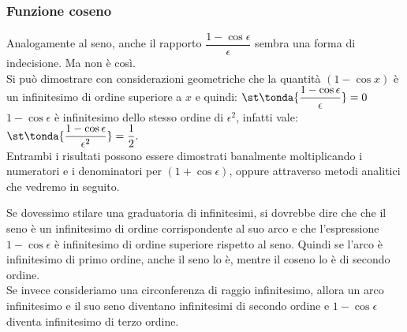 \subsubsection{Funzione coseno}
\label{subsubsec:insnum_fcoseno}
Analogamente al seno, anche il rapporto \(\dfrac{1-\cos \epsilon}{\epsilon}\)
sembra una forma di indecisione. 
Ma non è così. \\

Si può dimostrare con considerazioni geometriche che 
la quantità \((1-\cos x)\) è un infinitesimo di ordine superiore a 
\(x\) e quindi: \qquad
\(\displaystyle
 \st\tonda{\dfrac{1-\cos \epsilon}{\epsilon}}=0
\) \\

\(1-\cos \epsilon\) è infinitesimo dello stesso ordine di \(\epsilon^2\), 
infatti vale: \qquad
\(\displaystyle
 \st\tonda{\dfrac{1-\cos \epsilon}{\epsilon^2}}=\dfrac{1}{2}.
\) \\

Entrambi i risultati possono essere dimostrati banalmente moltiplicando i 
numeratori e i denominatori per \((1+\cos \epsilon)\), oppure attraverso 
metodi analitici che vedremo in seguito.

\begin{osservazione}
Se dovessimo stilare una graduatoria di infinitesimi, si dovrebbe dire che 
che il seno è un infinitesimo di ordine corrispondente al suo arco e che 
l'espressione \(1-\cos \epsilon\) è infinitesimo di ordine superiore 
rispetto al seno.
Quindi se l'arco è infinitesimo di primo ordine, anche il seno lo è, mentre
il coseno lo è di secondo ordine.\\
Se invece consideriamo una circonferenza di raggio infinitesimo, 
allora un arco infinitesimo e il suo seno diventano infinitesimi di secondo 
ordine e \(1-\cos \epsilon\) diventa infinitesimo di terzo ordine.
\end{osservazione}


